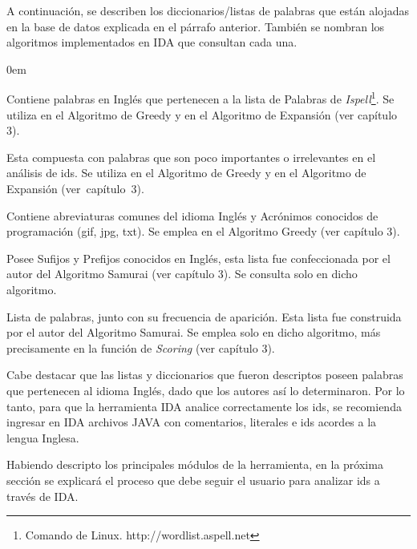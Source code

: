 A continuación, se describen los diccionarios/listas de palabras que están alojadas en la base de datos explicada en el párrafo anterior. También se nombran los algoritmos implementados en IDA que consultan cada una.

\begin{description}
\itemsep0em%

\item[Diccionario en Inglés (ispell):] Contiene palabras en Inglés que pertenecen a la lista de Palabras de \textit{Ispell}\footnote[1]{Comando de Linux. http://wordlist.aspell.net}. Se utiliza en el Algoritmo de Greedy y en el Algoritmo de Expansión (ver capítulo 3).

\item[Lista de Palabras Excluyentes (stop-list):] Esta compuesta con palabras que son poco importantes o irrelevantes en el análisis de ids. Se utiliza en el Algoritmo de Greedy y en el Algoritmo de Expansión \mbox{(ver capítulo 3)}.

\item[Lista de Abreviaturas y Acrónimos Conocidas:] Contiene abreviaturas comunes del idioma Inglés y Acrónimos conocidos de programación (gif, jpg, txt). Se emplea en el Algoritmo Greedy (ver capítulo 3).

\item[Lista de Prefijos y Sufijos Conocidos:] Posee Sufijos y Prefijos conocidos en Inglés, esta lista fue confeccionada por el autor del Algoritmo Samurai (ver capítulo 3). Se consulta solo en dicho algoritmo.

\item[Frecuencias Globales de Palabras:] Lista de palabras, junto con su frecuencia de aparición. Esta lista fue construida por el autor del Algoritmo Samurai. Se emplea solo en dicho algoritmo, más precisamente en la función de \textit{Scoring} (ver capítulo 3).

\end{description}

Cabe destacar que las listas y diccionarios que fueron descriptos poseen palabras que pertenecen al idioma Inglés, dado que los autores así lo determinaron. Por lo tanto, para que la herramienta IDA analice correctamente los ids, se recomienda ingresar en IDA archivos JAVA con comentarios, literales e ids acordes a la lengua Inglesa. 

Habiendo descripto los principales módulos de la herramienta, en la próxima sección se explicará el proceso que debe seguir el usuario para analizar ids a través de IDA.